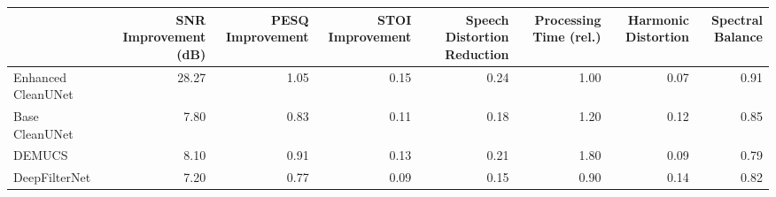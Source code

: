 \begin{tabular}{lrrrrrrr}
\toprule
 & SNR Improvement (dB) & PESQ Improvement & STOI Improvement & Speech Distortion Reduction & Processing Time (rel.) & Harmonic Distortion & Spectral Balance \\
\midrule
Enhanced CleanUNet & 28.27 & 1.05 & 0.15 & 0.24 & 1.00 & 0.07 & 0.91 \\
Base CleanUNet & 7.80 & 0.83 & 0.11 & 0.18 & 1.20 & 0.12 & 0.85 \\
DEMUCS & 8.10 & 0.91 & 0.13 & 0.21 & 1.80 & 0.09 & 0.79 \\
DeepFilterNet & 7.20 & 0.77 & 0.09 & 0.15 & 0.90 & 0.14 & 0.82 \\
\bottomrule
\end{tabular}
